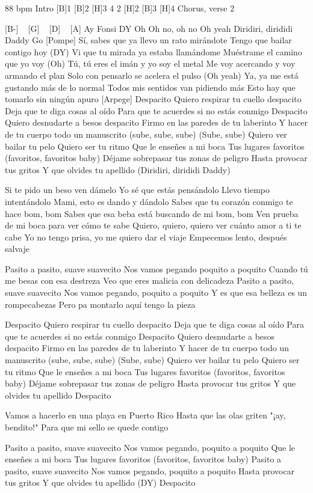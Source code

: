 \begin{guitar}
88 bpm
Intro
[B]1 [B]2 [H]3 4 2 [H]2 [B]3 [H]4
Chorus, verse 2

[B-] ~ [G] ~ [D] ~ [A]
Ay
Fonsi
DY
Oh
Oh no, oh no
Oh yeah
Diridiri, dirididi Daddy
Go
[Pompe]
Sí, sabes que ya llevo un rato mirándote
Tengo que bailar contigo hoy (DY)
Vi que tu mirada ya estaba llamándome
Muéstrame el camino que yo voy (Oh)
Tú, tú eres el imán y yo soy el metal
Me voy acercando y voy armando el plan
Solo con pensarlo se acelera el pulso (Oh yeah)
Ya, ya me está gustando más de lo normal
Todos mis sentidos van pidiendo más
Esto hay que tomarlo sin ningún apuro
[Arpege]
Despacito
Quiero respirar tu cuello despacito
Deja que te diga cosas al oído
Para que te acuerdes si no estás conmigo
Despacito
Quiero desnudarte a besos despacito
Firmo en las paredes de tu laberinto
Y hacer de tu cuerpo todo un manuscrito (sube, sube, sube)
(Sube, sube)
Quiero ver bailar tu pelo
Quiero ser tu ritmo
Que le enseñes a mi boca
Tus lugares favoritos (favoritos, favoritos baby)
Déjame sobrepasar tus zonas de peligro
Hasta provocar tus gritos
Y que olvides tu apellido (Diridiri, dirididi Daddy)

Si te pido un beso ven dámelo
Yo sé que estás pensándolo
Llevo tiempo intentándolo
Mami, esto es dando y dándolo
Sabes que tu corazón conmigo te hace bom, bom
Sabes que esa beba está buscando de mi bom, bom
Ven prueba de mi boca para ver cómo te sabe
Quiero, quiero, quiero ver cuánto amor a ti te cabe
Yo no tengo prisa, yo me quiero dar el viaje
Empecemos lento, después salvaje

Pasito a pasito, suave suavecito
Nos vamos pegando poquito a poquito
Cuando tú me besas con esa destreza
Veo que eres malicia con delicadeza
Pasito a pasito, suave suavecito
Nos vamos pegando, poquito a poquito
Y es que esa belleza es un rompecabezas
Pero pa montarlo aquí tengo la pieza

Despacito
Quiero respirar tu cuello despacito
Deja que te diga cosas al oído
Para que te acuerdes si no estás conmigo
Despacito
Quiero desnudarte a besos despacito
Firmo en las paredes de tu laberinto
Y hacer de tu cuerpo todo un manuscrito (sube, sube, sube)
(Sube, sube)
Quiero ver bailar tu pelo
Quiero ser tu ritmo
Que le enseñes a mi boca
Tus lugares favoritos (favoritos, favoritos baby)
Déjame sobrepasar tus zonas de peligro
Hasta provocar tus gritos
Y que olvides tu apellido
Despacito

Vamos a hacerlo en una playa en Puerto Rico
Hasta que las olas griten "¡ay, bendito!"
Para que mi sello se quede contigo

Pasito a pasito, suave suavecito
Nos vamos pegando, poquito a poquito
Que le enseñes a mi boca
Tus lugares favoritos (favoritos, favoritos baby)
Pasito a pasito, suave suavecito
Nos vamos pegando, poquito a poquito
Hasta provocar tus gritos
Y que olvides tu apellido (DY)
Despacito
\end{guitar}